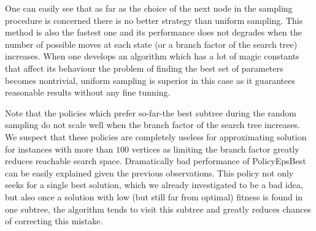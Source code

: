 One can easily see that as far as the choice of the next node in the sampling
procedure is concerned there is no better strategy than uniform sampling. This
method is also the fastest one and its performance does not degrades when the
number of possible moves at each state (or a branch factor of the search tree)
increases. When one develops an algorithm which has a lot of magic constants
that affect its behaviour the problem of finding the best set of parameters
becomes nontrivial, uniform sampling is superior in this case as it guarantees
reasonable results without any fine tunning.

Note that the policies which prefer so-far-the best subtree during the random
sampling do not scale well when the branch factor of the search tree increases.
We suspect that these policies are completely useless for approximating
solution for instances with more than $100$ vertices as limiting the branch
factor greatly reduces reachable search space. Dramatically bad performance of
PolicyEpsBest can be easily explained given the previous observations.  This
policy not only seeks for a single best solution, which we already investigated
to be a bad idea, but also once a solution with low (but still far from
optimal) fitness is found in one subtree, the algorithm tends to visit this
subtree and greatly reduces chances of correcting this mistake.
